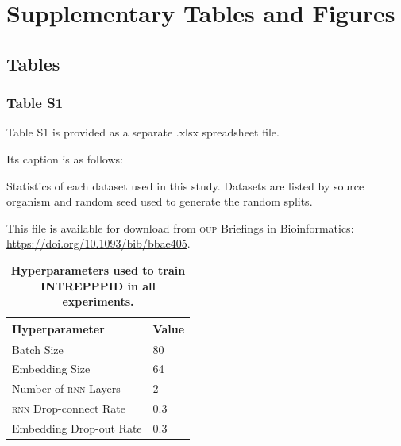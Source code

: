 \section*{Supplementary Tables and Figures}
\subsection*{Tables}

\subsubsection*{Table S1}
\label{sec:intrepppid_supp_s1}

Table S1 is provided as a separate .xlsx spreadsheet file.
\addtocounter{table}{1}

Its caption is as follows:

\begin{displayquote}
\begin{singlespace}
Statistics of each dataset used in this study. Datasets are listed by source organism and random seed used to generate the random splits.
\end{singlespace}
\end{displayquote}

\begin{tcolorbox}
    This file is available for download from \textsc{oup} Briefings in Bioinformatics:\\ \href{https://doi.org/10.1093/bib/bbae405}{https://doi.org/10.1093/bib/bbae405}.
\end{tcolorbox}

\newpage

\begin{table}[!h]
\centering
	\caption[Hyperparameters used to train \textsc{intrepppid} in all experiments.]{\textsf{\textbf{Hyperparameters used to train INTREPPPID in all experiments.}}} \label{tab:intrepppid_supp_hyperparameters} {\begin{tabular}{@{}ll@{}}\toprule 
			Hyperparameter & Value  \\\midrule
			Batch Size & 80 \\
            Embedding Size & 64 \\
            Number of \textsc{rnn} Layers & 2 \\
            \textsc{rnn} Drop-connect Rate & 0.3 \\
            Embedding Drop-out Rate & 0.3\\
			\midrule
	\end{tabular}}{}

\end{table}

